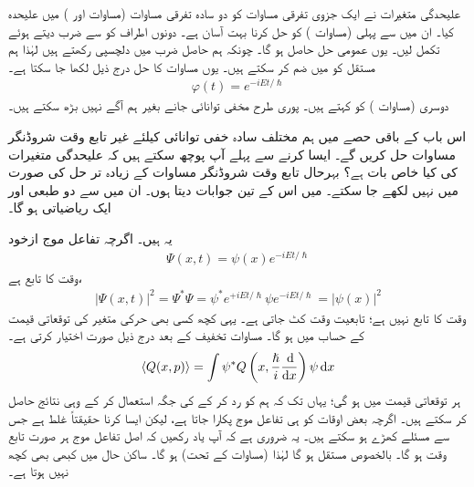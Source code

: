 علیحدگی متغیرات نے ایک جزوی تفرقی مساوات کو دو سادہ تفرقی مساوات (مساوات  اور ) میں علیحدہ کیا۔ ان میں سے پہلی  (مساوات ) کو حل کرنا بہت آسان ہے۔ دونوں اطراف کو  سے ضرب دیتے ہوئے تکمل لیں۔ یوں عمومی حل  حاصل ہو گا۔ چونکہ ہم   حاصل ضرب میں دلچسپی رکھتے ہیں لہٰذا ہم مستقل   کو    میں ضم کر سکتے ہیں۔ یوں مساوات  کا حل درج ذیل لکھا جا سکتا ہے۔ 
\begin{align}
\varphi(t) = e^{-iEt/\hslash}
\end{align}
دوسری  (مساوات )  کو  کہتے ہیں۔ پوری طرح مخفی توانائی  جانے بغیر ہم آگے نہیں بڑھ سکتے ہیں۔

اس باب کے باقی حصے میں ہم  مختلف سادہ خفی توانائی کیلئے غیر تابع وقت شروڈنگر مساوات حل کریں گے۔ ایسا کرنے سے پہلے آپ پوچھ سکتے ہیں کہ علیحدگی متغیرات کی کیا خاص بات ہے؟ بہرحال تابع وقت شروڈنگر مساوات کے زیادہ تر حل   کی صورت میں نہیں لکھے جا سکتے۔ میں اس کے تین جوابات دیتا ہوں۔ ان میں سے دو طبعی اور ایک ریاضیاتی ہو گا۔ 

\quad 
یہ  ہیں۔ اگرچہ تفاعل موج ازخود 
\begin{align}\label{مساوات_شروڈنگر_غیر_تابع_اور_تابع}
\Psi (x,t) = \psi (x) e^{-iEt/\hslash}
\end{align}
وقت  کا تابع ہے،  
\begin{align}
\left| \Psi (x,t) \right|^{2} = \Psi^{*}\Psi = \psi^{*}e^{+iEt/\hslash} \psi e^{-iEt/\hslash} = \left| \psi (x) \right|^{2}
\end{align}
وقت کا تابع نہیں ہے؛ تابعیت وقت کٹ جاتی ہے۔ یہی کچھ کسی بھی حرکی متغیر کی توقعاتی قیمت کے حساب میں ہو گا۔ مساوات  تخفیف کے بعد درج ذیل  صورت اختیار کرتی ہے۔ 
\begin{align}\label{مساوات_غیر_تابع_وقت_توقعاتی_قیمت}
\langle Q(x,p) \rangle = \int \psi^{*} Q \left( x, \frac{\hslash}{i} \frac{\dif}{\dif x} \right) \psi \dif x
\end{align}
ہر توقعاتی قیمت  میں  ہو گی؛ یہاں تک کہ ہم   کو رد کر کے   کی
 جگہ   استعمال کر کے وہی نتائج حاصل کر سکتے ہیں۔ اگرچہ بعض اوقات    کو ہی تفاعل موج پکارا جاتا ہے، لیکن ایسا کرنا حقیقتاً غلط ہے جس سے مسئلے کھڑے ہو سکتے ہیں۔ یہ ضروری ہے کہ آپ یاد رکھیں کہ اصل تفاعل موج ہر صورت تابع وقت ہو گا۔ بالخصوص   مستقل  ہو گا لہٰذا (مساوات  کے تحت)     ہو گا۔ ساکن حال میں کبھی بھی کچھ نہیں ہوتا ہے۔ 

